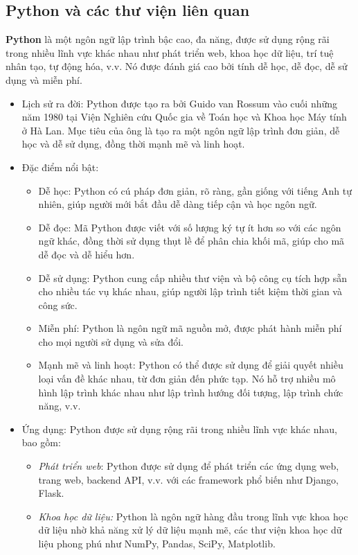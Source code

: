 \subsection{Python và các thư viện liên quan}
\textbf{Python} là một ngôn ngữ lập trình bậc cao, đa năng, được sử dụng rộng rãi trong nhiều lĩnh vực khác nhau như phát triển web, khoa học dữ liệu, trí tuệ nhân tạo, tự động hóa, v.v. Nó được đánh giá cao bởi tính dễ học, dễ đọc, dễ sử dụng và miễn phí.
\begin{itemize}
    \item Lịch sử ra đời:
    Python được tạo ra bởi Guido van Rossum vào cuối những năm 1980 tại Viện Nghiên cứu Quốc gia về Toán học và Khoa học Máy tính ở Hà Lan. Mục tiêu của ông là tạo ra một ngôn ngữ lập trình đơn giản, dễ học và dễ sử dụng, đồng thời mạnh mẽ và linh hoạt.
    \item Đặc điểm nổi bật:
        \begin{itemize}
            \item Dễ học: Python có cú pháp đơn giản, rõ ràng, gần giống với tiếng Anh tự nhiên, giúp người mới bắt đầu dễ dàng tiếp cận và học ngôn ngữ.
            \item Dễ đọc: Mã Python được viết với số lượng ký tự ít hơn so với các ngôn ngữ khác, đồng thời sử dụng thụt lề để phân chia khối mã, giúp cho mã dễ đọc và dễ hiểu hơn.
            \item Dễ sử dụng: Python cung cấp nhiều thư viện và bộ công cụ tích hợp sẵn cho nhiều tác vụ khác nhau, giúp người lập trình tiết kiệm thời gian và công sức.
            \item Miễn phí: Python là ngôn ngữ mã nguồn mở, được phát hành miễn phí cho mọi người sử dụng và sửa đổi.
            \item Mạnh mẽ và linh hoạt: Python có thể được sử dụng để giải quyết nhiều loại vấn đề khác nhau, từ đơn giản đến phức tạp. Nó hỗ trợ nhiều mô hình lập trình khác nhau như lập trình hướng đối tượng, lập trình chức năng, v.v.
        \end{itemize}
    \item Ứng dụng: 
    Python được sử dụng rộng rãi trong nhiều lĩnh vực khác nhau, bao gồm:
        \begin{itemize}
            \item \textit{Phát triển web}: Python được sử dụng để phát triển các ứng dụng web, trang web, backend API, v.v. với các framework phổ biến như Django, Flask.
            \item \textit{Khoa học dữ liệu:} Python là ngôn ngữ hàng đầu trong lĩnh vực khoa học dữ liệu nhờ khả năng xử lý dữ liệu mạnh mẽ, các thư viện khoa học dữ liệu phong phú như NumPy, Pandas, SciPy, Matplotlib.

\end{itemize}
\end{itemize}
